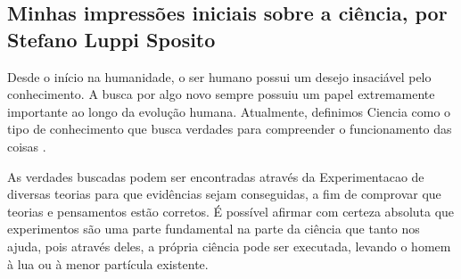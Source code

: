 \subsection{Minhas impressões iniciais sobre a ciência, por Stefano Luppi Sposito}

Desde o início na humanidade, o ser humano possui um desejo insaciável pelo conhecimento. A busca por algo novo sempre possuiu um papel extremamente importante ao longo da evolução humana. Atualmente, definimos \gls{Ciencia} como o tipo de conhecimento que busca verdades para compreender o funcionamento das coisas \citep{gnipper_o_nodate}.

As verdades buscadas podem ser encontradas através da \gls{Experimentacao} de diversas teorias para que evidências sejam conseguidas, a fim de comprovar que teorias e pensamentos estão corretos. É possível afirmar com certeza absoluta que experimentos são uma parte fundamental na parte da ciência que tanto nos ajuda, pois através deles, a própria ciência pode ser executada, levando o homem à lua ou à menor partícula existente. \citep{rabelo_o_2011}